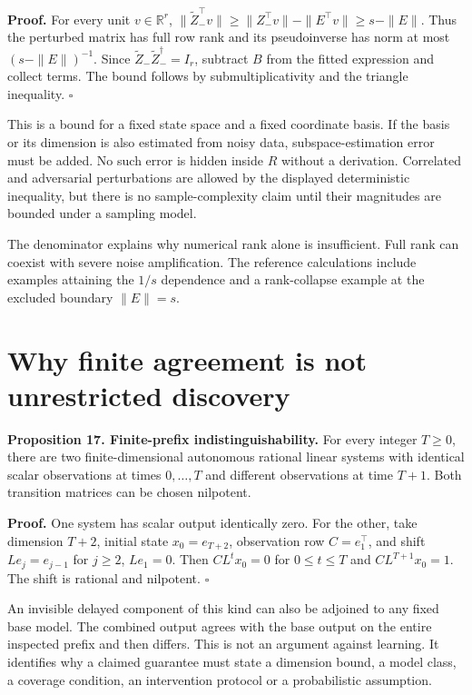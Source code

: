 \textbf{Proof.} For every unit \(v\in\mathbb R^r\),
\(\|\widetilde Z_-^\top v\|\geq\|Z_-^\top v\|-\|E^\top v\|\geq s-\|E\|\).
Thus the perturbed matrix has full row rank and its pseudoinverse has
norm at most \((s-\|E\|)^{-1}\). Since
\(\widetilde Z_-\widetilde Z_-^\dagger=I_r\), subtract \(B\) from the
fitted expression and collect terms. The bound follows by
submultiplicativity and the triangle inequality. \(\square\)

This is a bound for a fixed state space and a fixed coordinate basis. If
the basis or its dimension is also estimated from noisy data,
subspace-estimation error must be added. No such error is hidden inside
\(R\) without a derivation. Correlated and adversarial perturbations are
allowed by the displayed deterministic inequality, but there is no
sample-complexity claim until their magnitudes are bounded under a
sampling model.

The denominator explains why numerical rank alone is insufficient. Full
rank can coexist with severe noise amplification. The reference
calculations include examples attaining the \(1/s\) dependence and a
rank-collapse example at the excluded boundary \(\|E\|=s\).

\section{Why finite agreement is not unrestricted discovery}\label{LSM:why-finite-agreement-is-not-unrestricted-discovery}

\textbf{Proposition 17. Finite-prefix indistinguishability.} For every
integer \(T\geq0\), there are two finite-dimensional autonomous rational
linear systems with identical scalar observations at times
\(0,\ldots,T\) and different observations at time \(T+1\). Both
transition matrices can be chosen nilpotent.

\textbf{Proof.} One system has scalar output identically zero. For the
other, take dimension \(T+2\), initial state \(x_0=e_{T+2}\),
observation row \(C=e_1^\top\), and shift \(Le_j=e_{j-1}\) for
\(j\geq2\), \(Le_1=0\). Then \(CL^tx_0=0\) for \(0\leq t\leq T\) and
\(CL^{T+1}x_0=1\). The shift is rational and nilpotent. \(\square\)

An invisible delayed component of this kind can also be adjoined to any
fixed base model. The combined output agrees with the base output on the
entire inspected prefix and then differs. This is not an argument
against learning. It identifies why a claimed guarantee must state a
dimension bound, a model class, a coverage condition, an intervention
protocol or a probabilistic assumption.


